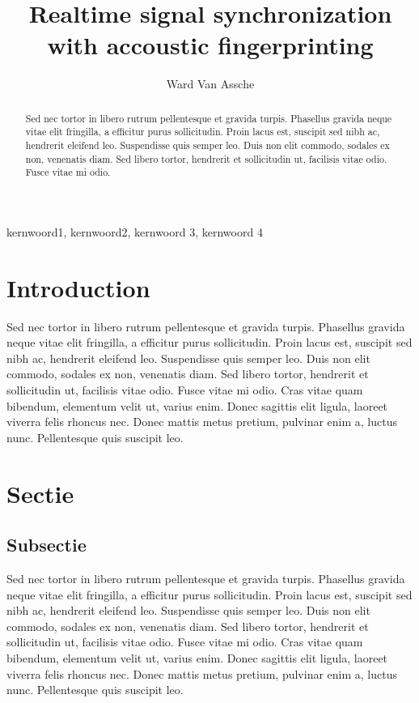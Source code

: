 \documentclass[twocolumn]{phdsymp} %
\begin{document}
\title{Realtime signal synchronization with accoustic fingerprinting} %

\author{Ward Van Assche}


\maketitle

\begin{abstract}
Sed nec tortor in libero rutrum pellentesque et gravida turpis. Phasellus gravida neque vitae elit fringilla, a efficitur purus sollicitudin. Proin lacus est, suscipit sed nibh ac, hendrerit eleifend leo. Suspendisse quis semper leo. Duis non elit commodo, sodales ex non, venenatis diam. Sed libero tortor, hendrerit et sollicitudin ut, facilisis vitae odio. Fusce vitae mi odio.
\end{abstract}

\begin{keywords}
kernwoord1, kernwoord2, kernwoord 3, kernwoord 4
\end{keywords}

\section{Introduction}
 Sed nec tortor in libero rutrum pellentesque et gravida turpis. Phasellus gravida neque vitae elit fringilla, a efficitur purus sollicitudin. Proin lacus est, suscipit sed nibh ac, hendrerit eleifend leo. Suspendisse quis semper leo. Duis non elit commodo, sodales ex non, venenatis diam. Sed libero tortor, hendrerit et sollicitudin ut, facilisis vitae odio. Fusce vitae mi odio. Cras vitae quam bibendum, elementum velit ut, varius enim. Donec sagittis elit ligula, laoreet viverra felis rhoncus nec. Donec mattis metus pretium, pulvinar enim a, luctus nunc. Pellentesque quis suscipit leo.


\section{Sectie}

\subsection{Subsectie}
Sed nec tortor in libero rutrum pellentesque\cite{six2014tarsosdsp} et gravida turpis. Phasellus gravida neque vitae elit fringilla, a efficitur purus sollicitudin. Proin lacus est, suscipit sed nibh ac, hendrerit eleifend leo. Suspendisse quis semper leo. Duis non elit commodo, sodales ex non, venenatis diam. Sed libero tortor, hendrerit et sollicitudin ut, facilisis vitae odio. Fusce vitae mi odio. Cras vitae quam bibendum, elementum velit ut, varius enim. Donec sagittis elit ligula, laoreet viverra felis rhoncus nec. Donec mattis metus pretium, pulvinar enim a, luctus nunc. Pellentesque quis suscipit leo.
\end{document}
